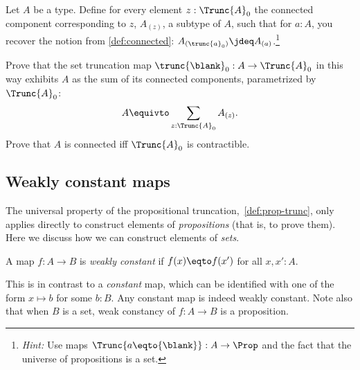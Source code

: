 \begin{xca}\label{xca:sum-of-conn-components}
  Let $A$ be a type. Define for every element $z : \Trunc{A}_0$
  the connected component corresponding to $z$, $A_{(z)}$,
  a subtype of $A$, such that for $a:A$, you recover the notion from
  \cref{def:connected}: $A_{(\trunc{a}_0)} \jdeq A_{(a)}$.\footnote{%
    \emph{Hint:} Use maps $\Trunc{a \eqto {\blank}} : A \to \Prop$
    and the fact that the universe of propositions
    is a set.}

  Prove that the set truncation map $\trunc{\blank}_0 : A \to \Trunc{A}_0$
  in this way exhibits $A$ as the sum of its connected components,
  parametrized by $\Trunc{A}_0$:
  \[
    A \equivto \sum_{z : \Trunc{A}_0} A_{(z)}.
  \]
  Prove that $A$ is connected iff $\Trunc{A}_0$ is contractible.
\end{xca}

\subsection{Weakly constant maps}

The universal property of the propositional truncation,~\cref{def:prop-trunc},
only applies directly to construct elements of \emph{propositions} (that is, to prove them).
Here we discuss how we can construct elements of \emph{sets}.

\begin{definition}
  A map $f: A \to B$ is \emph{weakly constant} if $f(x) \eqto f(x')$ for all $x,x':A$.
\end{definition}
This is in contrast to a \emph{constant} map,
which can be identified with one of the form $x \mapsto b$ for some $b:B$.
Any constant map is indeed weakly constant.
Note also that when $B$ is a set,
weak constancy of $f : A \to B$ is a proposition.

